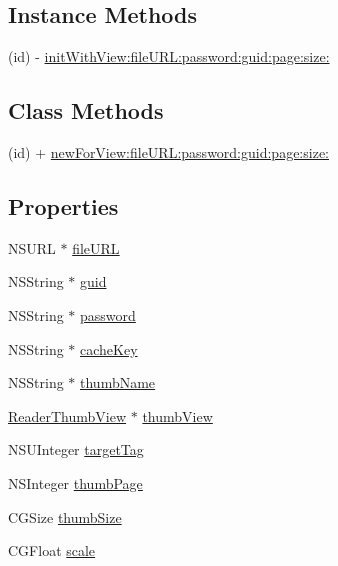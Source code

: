 \subsection*{Instance Methods}
\begin{DoxyCompactItemize}
\item 
(id) -\/ \hyperlink{interface_reader_thumb_request_ab638dcd23e07bd9b88b5f149b789a91a}{init\-With\-View\-:file\-U\-R\-L\-:password\-:guid\-:page\-:size\-:}
\end{DoxyCompactItemize}
\subsection*{Class Methods}
\begin{DoxyCompactItemize}
\item 
(id) + \hyperlink{interface_reader_thumb_request_aceedc8df03338e125e8e6872e46080bf}{new\-For\-View\-:file\-U\-R\-L\-:password\-:guid\-:page\-:size\-:}
\end{DoxyCompactItemize}
\subsection*{Properties}
\begin{DoxyCompactItemize}
\item 
N\-S\-U\-R\-L $\ast$ \hyperlink{interface_reader_thumb_request_aa09c8d6a1a8361f0c9718d7a349abeb9}{file\-U\-R\-L}
\item 
N\-S\-String $\ast$ \hyperlink{interface_reader_thumb_request_a5d8e0e0f2279f1de7554a7740c314626}{guid}
\item 
N\-S\-String $\ast$ \hyperlink{interface_reader_thumb_request_a404e2e2b62add0bd182bcbcbc88bac19}{password}
\item 
N\-S\-String $\ast$ \hyperlink{interface_reader_thumb_request_ac7a62d4e74ee6a35e068cab853b835ac}{cache\-Key}
\item 
N\-S\-String $\ast$ \hyperlink{interface_reader_thumb_request_acf28121ee63e65b1592485c1df30bac8}{thumb\-Name}
\item 
\hyperlink{interface_reader_thumb_view}{Reader\-Thumb\-View} $\ast$ \hyperlink{interface_reader_thumb_request_ab188b120cf0ddaa698106bd5f0ba672d}{thumb\-View}
\item 
N\-S\-U\-Integer \hyperlink{interface_reader_thumb_request_a177b60d5c03ad3407a82b3ca25f645ef}{target\-Tag}
\item 
N\-S\-Integer \hyperlink{interface_reader_thumb_request_a34178f66256a286b1936cd5951979928}{thumb\-Page}
\item 
C\-G\-Size \hyperlink{interface_reader_thumb_request_ab9dfcc6d38c38033127dd553b170435b}{thumb\-Size}
\item 
C\-G\-Float \hyperlink{interface_reader_thumb_request_a3093e22180f1847ff7acf1de7f4401de}{scale}
\end{DoxyCompactItemize}


